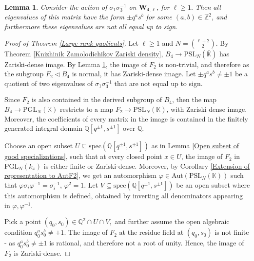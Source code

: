 \documentclass[10pt,a4paper]{amsart}
\newtheorem{lemma}[theorem]{Lemma}
\begin{document}
\setcounter{section}{7}
\setcounter{equation}{0}
\setcounter{theorem}{21}
\begin{lemma}
\label{Eigenvalues of sigma1sigma3inv}
Consider the action of $\sigma_1\sigma_3^{-1}$ on $\textbf{W}_{4, \ell}$, for $\ell \geq 1.$ Then all eigenvalues of this matrix have the form $\pm q^as^b$ for some $(a, b) \in \mathbb{Z}^2$, and furthermore these eigenvalues are not all equal up to sign.
\end{lemma}

\setcounter{section}{7}
\setcounter{equation}{0}
\setcounter{theorem}{22}
\begin{proof}[Proof of Theorem \ref{Large rank quotients}]
Let $\ell \geq 1$ and $N = \binom{\ell + 2}{2}$. By Theorem \ref{Knizhinik Zamolodichikov Zariski density}, $B_4 \to \mathrm{PSL}_N(\bar{\mathbb{K}})$ has Zariski-dense image. By Lemma \ref{Eigenvalues of sigma1sigma3inv}, the image of $F_2$ is non-trivial, and therefore as the subgroup $F_2 \lhd B_4$ is normal, it has Zariski-dense image. Let $\pm q^as^b \neq \pm 1$ be a quotient of two eigenvalues of $\sigma_1\sigma_3^{-1}$ that are not equal up to sign.

Since $F_2$ is also contained in the derived subgroup of $B_4$, then the map $B_4 \to \mathrm{PGL}_N(\mathbb{K})$ restricts to a map $F_2 \to \mathrm{PSL}_N(\mathbb{K})$, with Zariski dense image. Moreover, the coefficients of every matrix in the image is contained in the finitely generated integral domain $\mathbb{Q}[q^{\pm 1}, s^{\pm 1}]$ over $\mathbb{Q}$.

Choose an open subset $U \subseteq \mathrm{spec}(\mathbb{Q}[q^{\pm 1}, s^{\pm 1}])$ as in Lemma \ref{Open subset of good specializations}, such that at every closed point $x \in U$, the image of $F_2$ in $\mathrm{PGL}_N(k_x)$ is either finite or Zariski-dense. Moreover, by Corollary \ref{Extension of representation to AutF2}, we get an automorphism $\varphi \in \mathrm{Aut}(\mathrm{PSL}_N(\mathbb{K}))$ such that $\varphi\sigma_i\varphi^{-1} = \sigma_i^{-1}$, $\varphi^2 = 1$. Let $V \subseteq \mathrm{spec}(\mathbb{Q}[q^{\pm 1}, s^{\pm 1}])$ be an open subset where this automorphism is defined, obtained by inverting all denominators appearing in $\varphi, \varphi^{-1}$.

Pick a point $(q_0, s_0) \in \mathbb{Q}^2 \cap U \cap V,$ and further assume the open algebraic condition $q_0^as_0^b \neq \pm 1$. The image of $F_2$ at the residue field at $(q_0, s_0)$ is not finite - as $q_0^as_0^b \neq \pm 1$ is rational, and therefore not a root of unity. Hence, the image of $F_2$ is Zariski-dense.


\end{proof}
\end{document}
